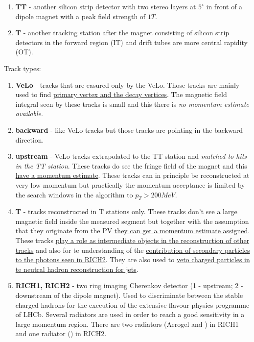 \documentclass[11pt,a4paper,twoside]{article}
\begin{document}
\begin{enumerate}
\begin{enumerate}
            \item \textbf{TT} - another silicon strip detector with two stereo layers at $5^\circ$  in front of a dipole magnet with a peak field strength of $1 T$.

            \item \textbf{T} - another tracking station after the magnet consisting of silicon strip detectors in the forward region (IT) and drift tubes are more central rapidity (OT).
        \end{enumerate}

        Track types:
        \begin{enumerate}
            \item \textbf{VeLo} - tracks that are easured only by the VeLo. Those tracks are mainly used to find \underline{primary vertex and the decay vertices}. The magnetic field integral seen by these tracks is small and this there is \textit{no momentum estimate available}.
            
            \item \textbf{backward} - like VeLo tracks but those tracks are pointing in the backward direction.
            
            \item \textbf{upstream} - VeLo tracks extrapolated to the TT station and \textit{matched to hits in the TT station}. These tracks do see the fringe field of the magnet and this \underline{have a momentum estimate}. These tracks can in principle be reconstructed at very low momentum but practically the momentum acceptance is limited by the search windows in the algorithm to $p_T > 200 MeV$.
            
            \item \textbf{T} - tracks reconstructed in T stations only. These tracks don't see a large magnetic field inside the measured segment but together with the assumption that they originate from the PV \underline{they can get a momentum estimate assigned}. These tracks \underline{play a role as intermediate objects in the reconstruction of other tracks} and also for te understanding of the \underline{contribution of secondary particles to the photons seen in RICH2}. They are also used to \underline{veto charged particles in te neutral hadron reconstruction for jets}.

            \item \textbf{RICH1, RICH2} - two ring imaging Cherenkov detector (1 - upstream; 2 - downstream of the dipole magnet). Used to discriminate between the stable charged hadrons for the execution of the extensive flavour physics programme of LHCb. Several radiators are used in order to reach a good sensitivity in a large momentum region. There are two radiators (Aerogel and  ) in RICH1 and one radiator () in RICH2.
            

\end{enumerate}
\end{enumerate}
\end{document}
